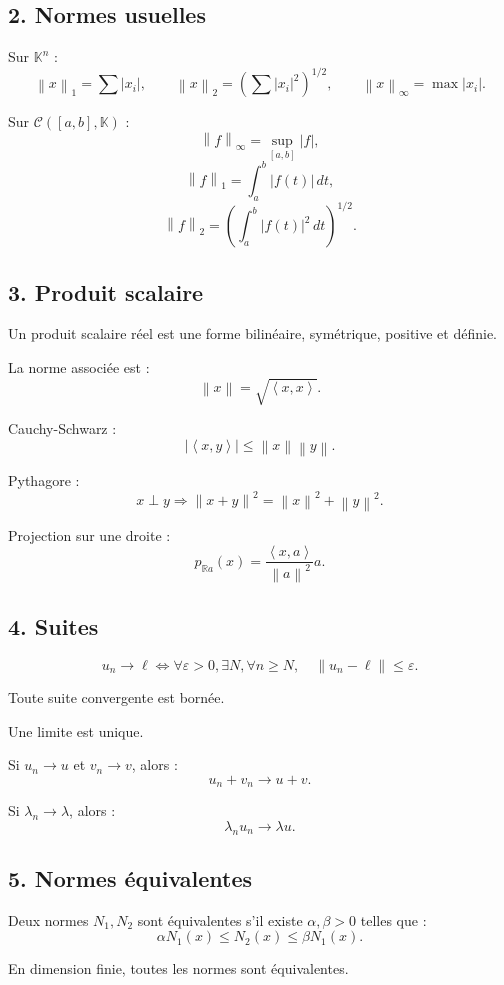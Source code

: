 \documentclass[11pt,a4paper]{article}
\newcommand{\K}{\mathbb K}
\newcommand{\R}{\mathbb R}
\newcommand{\norme}[1]{\left\lVert #1 \right\rVert}
\newcommand{\scal}[2]{\left\langle #1,#2\right\rangle}
\begin{document}
\subsection*{2. Normes usuelles}

Sur \(\K^n\) :
\[
\norme{x}_1=\sum |x_i|,
\qquad
\norme{x}_2=\left(\sum |x_i|^2\right)^{1/2},
\qquad
\norme{x}_\infty=\max |x_i|.
\]

Sur \(\mathcal C([a,b],\K)\) :
\[
\norme{f}_\infty=\sup_{[a,b]}|f|,
\]
\[
\norme{f}_1=\int_a^b |f(t)|\,dt,
\]
\[
\norme{f}_2=\left(\int_a^b |f(t)|^2\,dt\right)^{1/2}.
\]

\subsection*{3. Produit scalaire}

Un produit scalaire réel est une forme bilinéaire, symétrique, positive et définie.

La norme associée est :
\[
\norme{x}=\sqrt{\scal{x}{x}}.
\]

Cauchy-Schwarz :
\[
|\scal{x}{y}|\leq\norme{x}\norme{y}.
\]

Pythagore :
\[
x\perp y\Rightarrow \norme{x+y}^2=\norme{x}^2+\norme{y}^2.
\]

Projection sur une droite :
\[
p_{\R a}(x)=\frac{\scal{x}{a}}{\norme{a}^2}a.
\]

\subsection*{4. Suites}

\[
u_n\to\ell
\Longleftrightarrow
\forall\varepsilon>0,\exists N,\forall n\geq N,\quad \norme{u_n-\ell}\leq\varepsilon.
\]

Toute suite convergente est bornée.

Une limite est unique.

Si \(u_n\to u\) et \(v_n\to v\), alors :
\[
u_n+v_n\to u+v.
\]

Si \(\lambda_n\to\lambda\), alors :
\[
\lambda_nu_n\to\lambda u.
\]

\subsection*{5. Normes équivalentes}

Deux normes \(N_1,N_2\) sont équivalentes s'il existe \(\alpha,\beta>0\) telles que :
\[
\alpha N_1(x)\leq N_2(x)\leq \beta N_1(x).
\]

En dimension finie, toutes les normes sont équivalentes.
\end{document}
